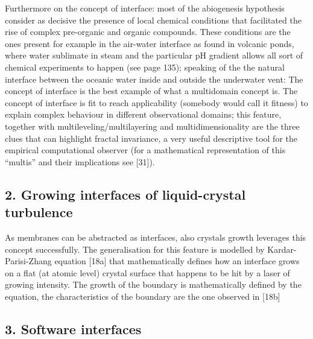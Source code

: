 \documentclass[14pt]{extarticle}
\begin{document}
Furthermore on the concept of interface: most of the abiogenesis hypothesis \cite{lingam2021life} consider as decisive the presence of local chemical conditions that facilitated the rise of complex pre-organic and organic compounds. These conditions are the ones present for example in the air-water interface as found in volcanic ponds, where water sublimate in steam and the particular pH gradient allows all sort of chemical experiments to happen (see \cite{lingam2021life} page 135); speaking of the the natural interface between the oceanic water inside and outside the underwater vent: 
\newline
\hspace*{15mm}The concept of interface is the best example of what a multidomain concept is. The concept of interface is fit to reach applicability (somebody would call it fitness) to explain complex behaviour in different observational domains; this feature, together with multileveling/multilayering and multidimensionality are the three clues that can highlight fractal invariance, a very useful descriptive tool for the empirical computational observer (for a mathematical representation of this “multis” and their implications see [31]).

\subsection*{2. Growing interfaces of liquid-crystal turbulence}
\label{subsec:crystals}
    
\hspace*{15mm}As membranes can be abstracted as interfaces, also crystals growth leverages this concept successfully. The generalisation for this feature is modelled by Kardar-Parisi-Zhang equation [18a] that mathematically defines how an interface grows on a flat (at atomic level) crystal surface that happens to be hit by a laser of growing intensity. The growth of the boundary is mathematically defined by the equation, the characteristics of the boundary are the one observed in [18b]

\subsection*{3. Software interfaces}
\label{subsec:software}
\end{document}
